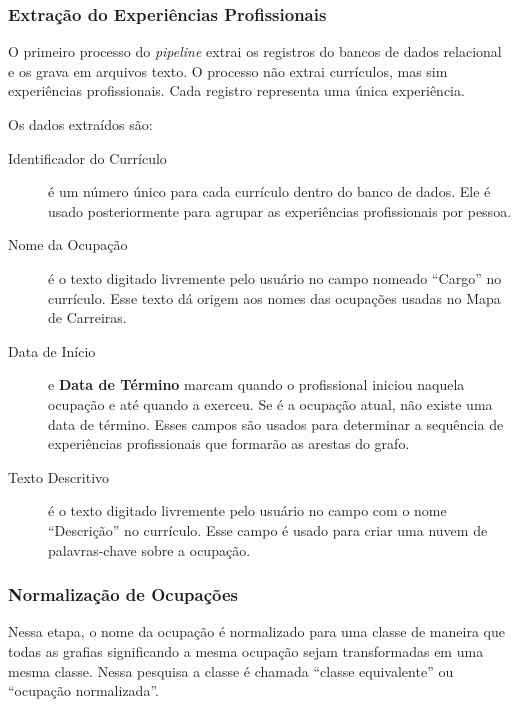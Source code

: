 \documentclass[12pt,a4paper]{article}
\theoremstyle{hypo}
\begin{document}
\subsubsection{Extração do Experiências Profissionais} \label{sec:extracao-experiencia}

O primeiro processo do \textit{pipeline} extrai os registros do bancos de dados relacional e os grava em arquivos texto. O processo não extrai currículos, mas sim experiências profissionais. Cada registro representa uma única experiência.

Os dados extraídos são:

\begin{description}

  \item[Identificador do Currículo] é um número único para cada currículo dentro do banco de dados. Ele é usado posteriormente para agrupar as experiências profissionais por pessoa.

  \item[Nome da Ocupação] é o texto digitado livremente pelo usuário no campo nomeado \enquote{Cargo} no currículo. Esse texto dá origem aos nomes das ocupações usadas no Mapa de Carreiras.

  \item[Data de Início] e \textbf{Data de Término} marcam quando o profissional iniciou naquela ocupação e até quando a exerceu. Se é a ocupação atual, não existe uma data de término. Esses campos são usados para determinar a sequência de experiências profissionais que formarão as arestas do grafo.

  \item[Texto Descritivo] é o texto digitado livremente pelo usuário no campo com o nome \enquote{Descrição} no currículo. Esse campo é usado para criar uma nuvem de palavras-chave sobre a ocupação.

\end{description}

\subsubsection{Normalização de Ocupações} \label{sec:normalizacao}

Nessa etapa, o nome da ocupação é normalizado para uma classe de maneira que todas as grafias significando a mesma ocupação sejam transformadas em uma mesma classe. Nessa pesquisa a classe é chamada \enquote{classe equivalente} ou \enquote{ocupação normalizada}.
\end{document}
